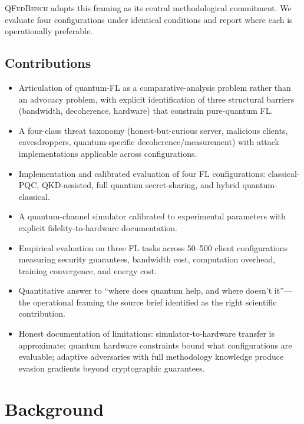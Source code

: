 \documentclass[sigconf,nonacm]{acmart}
\begin{document}
\textsc{QFedBench} adopts this framing as its central
methodological commitment. We evaluate four configurations under
identical conditions and report where each is operationally
preferable.

\subsection{Contributions}

\begin{itemize}
  \item Articulation of quantum-FL as a comparative-analysis
        problem rather than an advocacy problem, with explicit
        identification of three structural barriers (bandwidth,
        decoherence, hardware) that constrain pure-quantum FL.
  \item A four-class threat taxonomy
        (honest-but-curious server, malicious clients,
        eavesdroppers, quantum-specific decoherence/measurement)
        with attack implementations applicable across
        configurations.
  \item Implementation and calibrated evaluation of four FL
        configurations: classical-PQC, QKD-assisted, full
        quantum secret-sharing, and hybrid quantum-classical.
  \item A quantum-channel simulator calibrated to experimental
        parameters with explicit fidelity-to-hardware
        documentation.
  \item Empirical evaluation on three FL tasks across 50--500
        client configurations measuring security guarantees,
        bandwidth cost, computation overhead, training
        convergence, and energy cost.
  \item Quantitative answer to ``where does quantum help, and
        where doesn't it''---the operational framing the source
        brief identified as the right scientific contribution.
  \item Honest documentation of limitations: simulator-to-hardware
        transfer is approximate; quantum hardware constraints
        bound what configurations are evaluable; adaptive
        adversaries with full methodology knowledge produce
        evasion gradients beyond cryptographic guarantees.
\end{itemize}

\section{Background}
\end{document}

